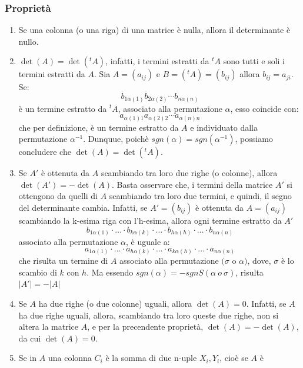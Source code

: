 \documentclass{article}
\newcommand{\ah}{\alpha}
\begin{document}
\subsubsection{Proprietà}
\begin{enumerate}
    \item Se una colonna (o una riga) di una matrice è nulla, allora il determinante è
          nullo.
    \item $\det(A) = \det({^{t}A})$, infatti, i termini estratti da ${^{t}A}$ sono tutti e soli i termini estratti da $A$. Sia $A= (a_{ij})$ e $B = ({^{t}A}) = (b_{ij})$ allora $b_{ij} = a_{ji}$. Se:
          \[
              b_{1\ah(1)}b_{2\ah(2)}\cdots b_{n\ah(n)}
          \]
          è un termine estratto da ${^{t}A}$, associato alla permutazione $\ah$, esso coincide con:
          \[
              a_{\ah(1)1}a_{\ah(2)2}\cdots a_{\ah(n)n}
          \]
          che per definizione, è un termine estratto da $A$ e individuato dalla
          permutazione $\ah^{-1}$. Dunquue, poichè $sgn (\ah) = sgn (\ah^{-1})$, possiamo
          concludere che $\det(A) = \det({^{t}A})$.
    \item Se $A'$ è ottenuta da $A$ scambiando tra loro due righe (o colonne), allora
          $\det(A') = -\det(A)$. Basta osservare che, i termini della matrice $A'$ si
          ottengono da quelli di $A$ scambiando tra loro due termini, e quindi, il segno
          del determinante cambia. Infatti, se $A'=(b_{ij})$ è ottenuta da $A= (a_{ij})$
          scambiando la k-esima riga con l'h-esima, allora ogni termine estratto da $A'$
          \[
              b_{1\ah(1)}\cdot\ldots\cdot b_{k\ah(k)}\cdot\ldots\cdot b_{h\ah(h)}\cdot\ldots\cdot b_{n\ah(n)}
          \]
          associato alla permutazione $\ah$, è uguale a:
          \[
              a_{1\ah(1)}\cdot\ldots\cdot a_{h\ah(k)}\cdot\ldots\cdot a_{k\ah(h)}\cdot\ldots\cdot a_{n\ah(n)}
          \]
          che risulta un termine di $A$ associato alla permutazione $(\sigma$ o $\ah)$,
          dove, $\sigma$ è lo scambio di $k$ con $h$. Ma essendo $sgn(\ah)=-sgn S (\ah\ o
              \ \sigma)$, risulta $|A'| = -|A|$
    \item Se $A$ ha due righe (o due colonne) uguali, allora $\det(A) = 0$. Infatti, se
          $A$ ha due righe uguali, allora, scambiando tra loro queste due righe, non si
          altera la matrice $A$, e per la precendente proprietà, $\det(A) = -\det(A)$, da
          cui $\det(A) = 0$.
    \item Se in $A$ una colonna $C_i$ è la somma di due n-uple $X_i, Y_i$, cioè se $A$ è

\end{enumerate}
\end{document}
